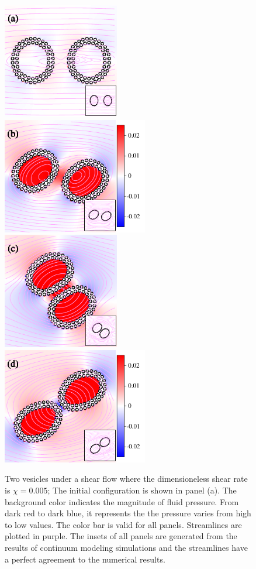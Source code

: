 \documentclass[lineno]{jfm}
\begin{document}
\begin{figure}
\centering
\includegraphics[height=2in]{N116_shear_0.pdf}
\includegraphics[height=2in]{N116_shear_2500.pdf}\\
\includegraphics[height=2in]{N116_shear_5000.pdf}
\includegraphics[height=2in]{N116_shear_7500.pdf}
  \caption{Two vesicles under a shear flow where the dimensioneless shear rate is $\chi=0.005$; The initial configuration is shown in panel (a). The background color indicates the magnitude of fluid pressure. From dark red to dark blue, it represents the the pressure varies from high to low values. The color bar is valid for all panels. Streamlines are plotted in purple. The insets of all panels are generated from the results of continuum modeling simulations and the streamlines have a perfect agreement to the numerical results.
  }
    \label{figure10}
\end{figure}
\end{document}
